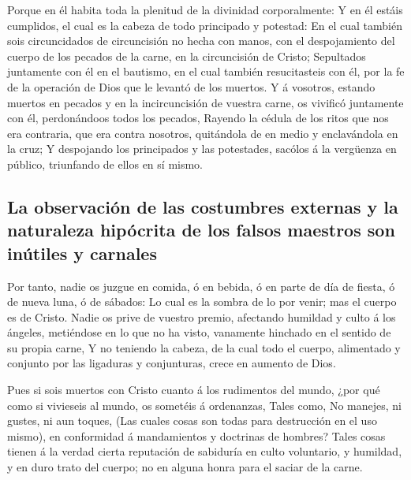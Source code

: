  Porque en él habita toda la plenitud de la divinidad
corporalmente:  Y en él estáis cumplidos, el cual es la
cabeza de todo principado y potestad:  En el cual también
sois circuncidados de circuncisión no hecha con manos, con el
despojamiento del cuerpo de los pecados de la carne, en la circuncisión
de Cristo;  Sepultados juntamente con él en el bautismo, en
el cual también resucitasteis con él, por la fe de la operación de Dios
que le levantó de los muertos.  Y á vosotros, estando
muertos en pecados y en la incircuncisión de vuestra carne, os vivificó
juntamente con él, perdonándoos todos los pecados,  Rayendo
la cédula de los ritos que nos era contraria, que era contra nosotros,
quitándola de en medio y enclavándola en la cruz;  Y
despojando los principados y las potestades, sacólos á la vergüenza en
público, triunfando de ellos en sí mismo.

\hypertarget{la-observaciuxf3n-de-las-costumbres-externas-y-la-naturaleza-hipuxf3crita-de-los-falsos-maestros-son-inuxfatiles-y-carnales}{%
\subsection{La observación de las costumbres externas y la naturaleza
hipócrita de los falsos maestros son inútiles y
carnales}\label{la-observaciuxf3n-de-las-costumbres-externas-y-la-naturaleza-hipuxf3crita-de-los-falsos-maestros-son-inuxfatiles-y-carnales}}

 Por tanto, nadie os juzgue en comida, ó en bebida, ó en
parte de día de fiesta, ó de nueva luna, ó de sábados:  Lo
cual es la sombra de lo por venir; mas el cuerpo es de Cristo.
 Nadie os prive de vuestro premio, afectando humildad y
culto á los ángeles, metiéndose en lo que no ha visto, vanamente
hinchado en el sentido de su propia carne,  Y no teniendo
la cabeza, de la cual todo el cuerpo, alimentado y conjunto por las
ligaduras y conjunturas, crece en aumento de Dios.

 Pues si sois muertos con Cristo cuanto á los rudimentos
del mundo, ¿por qué como si vivieseis al mundo, os sometéis á
ordenanzas,  Tales como, No manejes, ni gustes, ni aun
toques,  (Las cuales cosas son todas para destrucción en el
uso mismo), en conformidad á mandamientos y doctrinas de hombres?
 Tales cosas tienen á la verdad cierta reputación de
sabiduría en culto voluntario, y humildad, y en duro trato del cuerpo;
no en alguna honra para el saciar de la carne.

